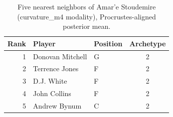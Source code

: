 \begin{table}[htbp]
  \centering\small
  \begin{tabular}{rllc}
    \toprule
    Rank & Player & Position & Archetype \\
    \midrule
    1 & Donovan Mitchell & G & 2 \\
    2 & Terrence Jones & F & 2 \\
    3 & D.J. White & F & 2 \\
    4 & John Collins & F & 2 \\
    5 & Andrew Bynum & C & 2 \\
    \bottomrule
  \end{tabular}
  \caption{Five nearest neighbors of Amar'e Stoudemire (curvature_m4 modality), Procrustes-aligned posterior mean.}
  \label{tab:Amar_e_Stoudemire_neighbors_curvature_m4}
\end{table}

